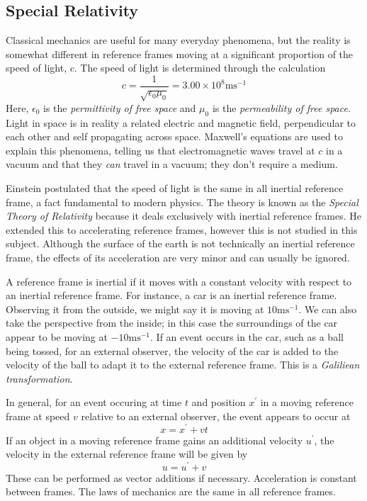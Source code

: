 \documentclass[12pt]{report}
\begin{document}
\begin{flushleft}
\section*{Special Relativity}
Classical mechanics are useful for many everyday phenomena, but the reality is
somewhat different in reference frames moving at a significant proportion of
the speed of light, \(c\). The speed of light is determined through the 
calculation
\[c = \frac{1}{\sqrt{\epsilon_0\mu_0}} = 3.00\times10^8\mathrm{ms}^{-1}\]
Here, \(\epsilon_0\) is the \textit{permittivity of free space} and \(\mu_0\)
is the \textit{permeability of free space}. Light in space is in reality a
related electric and magnetic field, perpendicular to each other and self
propagating across space. Maxwell's equations are used to explain this 
phenomena, telling us that electromagnetic waves travel at \(c\) in a vacuum
and that they \textit{can} travel in a vacuum; they don't require a medium.

\bigskip
Einstein postulated that the speed of light is the same in all inertial 
reference frame, a fact fundamental to modern physics. The theory is known
as the \textit{Special Theory of Relativity} because it deals exclusively
with inertial reference frames. He extended this to accelerating reference
frames, however this is not studied in this subject. Although the surface of
the earth is not technically an inertial reference frame, the effects of its
acceleration are very minor and can usually be ignored. 

\bigskip
A reference frame is inertial if it moves with a constant velocity with respect
to an inertial reference frame. For instance, a car is an inertial reference
frame. Observing it from the outside, we might say it is moving at 
\(10\mathrm{ms}^{-1}\). We can also take the perspective from the inside; in
this case the surroundings of the car appear to be moving at 
\(-10\mathrm{ms}^{-1}\). If an event occurs in the car, such as a ball being 
tossed, for an external observer, the velocity of the car is added to the 
velocity of the ball to adapt it to the external reference frame. This is a 
\textit{Galiliean transformation}.

\bigskip
In general, for an event occuring at time \(t\) and position \(x^\prime\) in a
moving reference frame at speed \(v\) relative to an external observer, the 
event appears to occur at
\[x = x^\prime + vt\]
If an object in a moving reference frame gains an additional velocity 
\(u^\prime\), the velocity in the external reference frame will be given
by
\[u = u^\prime + v\]
These can be performed as vector additions if necessary. Acceleration is 
constant between frames. The laws of mechanics are the same in all reference
frames.

\end{flushleft}
\end{document}
